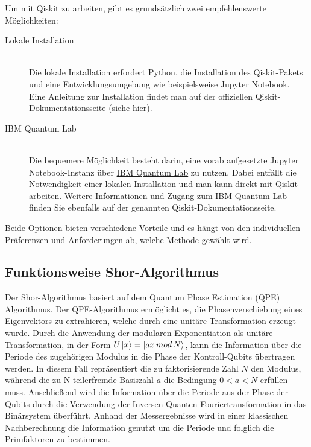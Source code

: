 \documentclass[
	a4paper, %
	10pt, %
	unnumberedsections, %
	twoside, %
]{LTJournalArticle}
\begin{document}
Um mit Qiskit zu arbeiten, gibt es grundsätzlich zwei empfehlenswerte Möglichkeiten:
\begin{description}
\item[Lokale Installation]\hfill \\
Die lokale Installation erfordert Python, die Installation des Qiskit-Pakets und eine Entwicklungsumgebung wie beispielsweise Jupyter Notebook. Eine Anleitung zur Installation findet man auf der offiziellen Qiskit-Dokumentationsseite (siehe \href{https://qiskit.org/documentation/stable/0.24/install.html}{hier}).
\item[IBM Quantum Lab]\hfill \\
Die bequemere Möglichkeit besteht darin, eine vorab aufgesetzte Jupyter Notebook-Instanz über \href{https://qiskit.org/documentation/stable/0.24/install.html}{IBM Quantum Lab} zu nutzen. Dabei entfällt die Notwendigkeit einer lokalen Installation und man kann direkt mit Qiskit arbeiten. Weitere Informationen und Zugang zum IBM Quantum Lab finden Sie ebenfalls auf der genannten Qiskit-Dokumentationsseite.
\end{description}
Beide Optionen bieten verschiedene Vorteile und es hängt von den individuellen Präferenzen und Anforderungen ab, welche Methode gewählt wird.

\subsection{\Large Funktionsweise Shor-Algorithmus}

Der Shor-Algorithmus basiert auf dem Quantum Phase Estimation (QPE) Algorithmus. Der QPE-Algorithmus ermöglicht es, die Phasenverschiebung eines Eigenvektors zu extrahieren, welche durch eine unitäre Transformation erzeugt wurde. Durch die Anwendung der modularen Exponentiation als unitäre Transformation, in der Form $U\ket{x} = \ket{ax\,mod\,N}$\autocite{IBM:Shor}, kann die Information über die Periode des zugehörigen Modulus in die Phase der Kontroll-Qubits übertragen werden. In diesem Fall repräsentiert die zu faktorisierende Zahl $N$ den Modulus, während die zu N teilerfremde Basiszahl $a$ die Bedingung $0 < a < N$ erfüllen muss. Anschließend wird die Information über die Periode aus der Phase der Qubits durch die Verwendung der Inversen Quanten-Fouriertransformation in das Binärsystem überführt. Anhand der Messergebnisse wird in einer klassischen Nachberechnung die Information genutzt um die Periode und folglich die Primfaktoren zu bestimmen.
\end{document}
